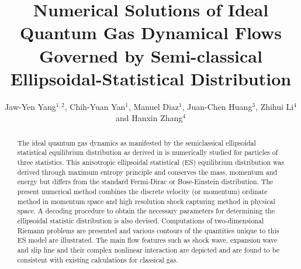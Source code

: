 \documentclass{rsproca}%
\begin{document}
\title{Numerical Solutions of Ideal Quantum Gas Dynamical Flows Governed by Semi-classical Ellipsoidal-Statistical Distribution}

\author{%
Jaw-Yen Yang$^{1,2}$, Chih-Yuan Yan$^{1}$, Manuel Diaz$^{1}$, Juan-Chen Huang$^{3}$, Zhihui Li$^{4}$ and Hanxin Zhang$^{4}$}

\address{$^{1}$Institute of Applied Mechanics, National Taiwan University, Taipei 10764, TAIWAN\\
$^{2}$Center for Advanced Study in Theoretical Science, National Taiwan University, Taipei 10764, TAIWAN\\
$^{3}$Department of Merchant Marine, National Taiwan Ocean University, Taipei 10764, TAIWAN\\
$^{4}$China Aerodynamics Research and Development Center, Mianyang, 621000, CHINA}


\subject{Semi-classical Boltzmann equation, Semi-classical Ellipsoidal Statistical Model, Kinetic Numerical Method, Quantum Gas Dynamical Flows}



\begin{abstract}
The ideal quantum gas dynamics as manifested by the semiclassical ellipsoidal statistical equilibrium distribution as derived in \cite{Wu2012} is numerically studied for particles of three statistics.  This anisotropic ellipsoidal statistical (ES) equilibrium distribution was derived through maximum entropy principle and conserves the mass, momentum and energy but differs from the standard Fermi-Dirac or Bose-Einstein distribution. The present numerical method combines the discrete velocity (or momentum) ordinate method in momentum space and high resolution shock capturing method in physical space.   A decoding procedure to obtain the necessary parameters for determining the ellipsoidal statistic distribution is also devised.  Computations of two-dimensional Riemann problems are presented and various contours of the quantities unique to this ES model are illustrated.  The main flow features such as shock wave, expansion wave and slip line and their complex nonlinear interaction are depicted and are found to be consistent with existing calculations for classical gas.
\end{abstract}
\end{document}
